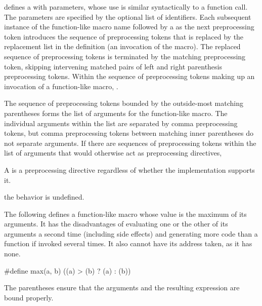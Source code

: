 \documentclass{wg21}
\begin{document}
defines a 
with parameters, whose use is
similar syntactically to a function call.
The parameters
%
are specified by the optional list of identifiers.
Each subsequent instance of the function-like macro name followed by a
\tcode{(}
as the next preprocessing token
introduces the sequence of preprocessing tokens that is replaced
by the replacement list in the definition
(an invocation of the macro).
%
The replaced sequence of preprocessing tokens is terminated by the matching
\tcode{)}
preprocessing token, skipping intervening matched pairs of left and
right parenthesis preprocessing tokens.
Within the sequence of preprocessing tokens making up an invocation
of a function-like macro,
.

\pnum
{}%
The sequence of preprocessing tokens
bounded by the outside-most matching parentheses
forms the list of arguments for the function-like macro.
The individual arguments within the list
are separated by comma preprocessing tokens,
but comma preprocessing tokens between matching
inner parentheses do not separate arguments.
If there are sequences of preprocessing tokens within the list of
arguments that would otherwise act as preprocessing directives,
\begin{footnote}
    A  is a preprocessing directive regardless of whether the implementation supports it.
\end{footnote}
the behavior is undefined.

\pnum
\begin{example}
    The following defines a function-like
    macro whose value is the maximum of its arguments.
    It has the disadvantages of evaluating one or the other of its arguments
    a second time
    (including
    side effects)
    and generating more code than a function if invoked several times.
    It also cannot have its address taken,
    as it has none.

    \begin{codeblock}
        #define max(a, b) ((a) > (b) ? (a) : (b))
    \end{codeblock}

    The parentheses ensure that the arguments and
    the resulting expression are bound properly.
\end{example}
\end{document}
